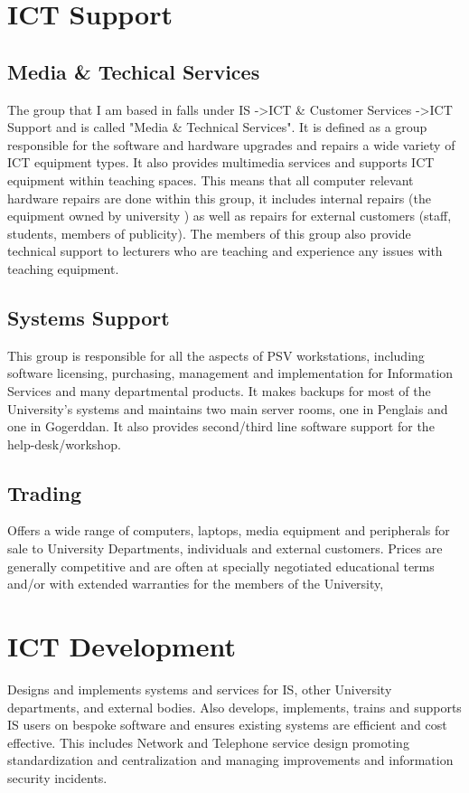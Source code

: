 \documentclass[10pt,a4paper,headinclude=true]{report}
\begin{document}
\section{ICT Support}
\subsection{Media \& Techical Services}
The group that I am based in falls under IS -\textgreater ICT \& Customer Services -\textgreater ICT Support and is called "Media \& Technical Services". It is defined as a group responsible for the software and hardware upgrades and repairs a wide variety of ICT equipment types. It also provides multimedia services and supports ICT equipment within teaching spaces. This means that all computer relevant hardware repairs are done within this group, it includes internal repairs (the equipment owned by university ) as well as repairs for external customers (staff, students, members of publicity). The members of this group also provide technical support to lecturers who are teaching and experience any issues with teaching equipment.
\subsection{Systems Support}
This group is responsible for all the aspects of PSV workstations, including software licensing, purchasing, management and implementation for Information Services and many departmental products. It makes backups for most of the University's systems and maintains two main server rooms, one in Penglais and one in Gogerddan. It also provides second/third line software support for the help-desk/workshop.
\subsection{Trading}
Offers a wide range of computers, laptops, media equipment and peripherals for sale to University Departments, individuals and external customers. Prices are generally competitive and are often at specially negotiated educational terms and/or with extended warranties for the members of the University,
\section{ICT Development}
Designs and implements systems and services for IS, other University departments, and external bodies. Also develops, implements, trains and supports IS users on bespoke software and ensures existing systems are efficient and cost effective. This includes Network and Telephone service design promoting standardization and centralization and managing improvements and information security incidents.
\end{document}
